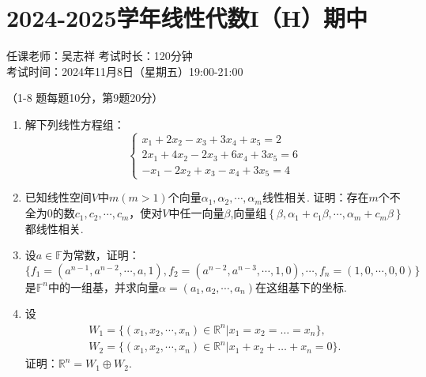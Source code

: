 \section*{2024-2025学年线性代数I（H）期中}

\begin{center}
    任课老师：吴志祥\hspace{4em} 考试时长：120分钟 \\
    考试时间：2024年11月8日（星期五）19:00-21:00
\end{center}

（1-8 题每题10分，第9题20分）

\begin{enumerate}
    \item 解下列线性方程组：
          \[
              \begin{cases}
                  x_1 + 2x_2 - x_3 + 3x_4 +x_5 = 2     \\
                  2x_1 + 4x_2 - 2x_3 + 6x_4 + 3x_5 = 6 \\
                  -x_1 - 2x_2 + x_3 - x_4 + 3x_5 = 4
              \end{cases}
          \]

    \item 已知线性空间\(V\)中\(m(m > 1)\)个向量\(\alpha_1,\alpha_2,\cdots,\alpha_{m}\)线性相关. 证明：存在\(m\)个不全为\(0\)的数\(c_1,c_2,\cdots,c_{m}\)，使对\(V\)中任一向量\(\beta\),向量组\(\left\{ \beta,\alpha_1 + c_1\beta,\cdots,\alpha_{m} + c_{m}\beta \right\}\)都线性相关.

    \item 设\(a \in \mathbb{F}\)为常数，证明：
          \[\{ f_1 = \left( a^{n - 1},a^{n - 2},\cdots,a,1 \right),f_2 = \left( a^{n - 2},a^{n - 3},\cdots,1,0 \right),\cdots,f_{n} = (1,0,\cdots,0,0)\}\]
          是\(\mathbb{F}^{n}\)中的一组基，并求向量\(\alpha = \left( a_1,a_2,\cdots,a_{n} \right)\)在这组基下的坐标.

    \item 设
          \begin{align*}
              W_1 = \{ \left( x_1,x_2,\cdots,x_{n} \right) \in  \mathbb{R}^{n} | x_1 = x_2 = \ldots = x_{n} \}, \\
              W_2 = \{ \left( x_1,x_2,\cdots,x_{n} \right) \in  \mathbb{R}^{n} | x_1 + x_2 + \ldots + x_{n} = 0 \}.
          \end{align*}
          证明：\(\mathbb{R}^{n} = W_1 \oplus W_2\).


\end{enumerate}
